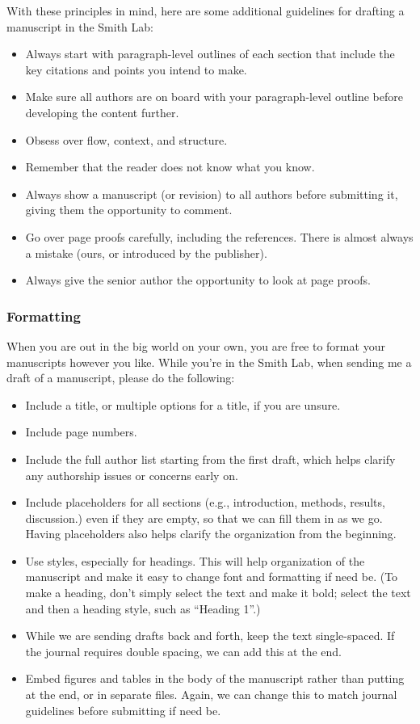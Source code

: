 \documentclass[letterpaper,11pt,oneside]{memoir}
\begin{document}
With these principles in mind, here are some additional guidelines for drafting a manuscript in the Smith Lab:

\begin{itemize}[noitemsep,nolistsep]
\item Always start with paragraph-level outlines of each section that include the key citations and points you intend to make.
\item Make sure all authors are on board with your paragraph-level outline before developing the content further.
\item Obsess over flow, context, and structure.
\item Remember that the reader does not know what you know.
\item Always show a manuscript (or revision) to all authors before submitting it, giving them the opportunity to comment.
\item Go over page proofs carefully, including the references. There is almost always a mistake (ours, or introduced by the publisher).
\item Always give the senior author the opportunity to look at page proofs.
\end{itemize}


\subsubsection{Formatting}

When you are out in the big world on your own, you are free to format your manuscripts however you like. While you're in the Smith Lab, when sending me a draft of a manuscript, please do the following:

\begin{itemize}[noitemsep,nolistsep]
\item Include a title, or multiple options for a title, if you are unsure. 
\item Include page numbers.
\item Include the full author list starting from the first draft, which helps clarify any authorship issues or concerns early on.
\item Include placeholders for all sections (e.g., introduction, methods, results, discussion.) even if they are empty, so that we can fill them in as we go. Having placeholders also helps clarify the organization from the beginning.
\item Use styles, especially for headings. This will help organization of the manuscript and make it easy to change font and formatting if need be. (To make a heading, don't simply select the text and make it bold; select the text and then a heading style, such as ``Heading 1''.)
\item While we are sending drafts back and forth, keep the text single-spaced. If the journal requires double spacing, we can add this at the end.
\item Embed figures and tables in the body of the manuscript rather than putting at the end, or in separate files. Again, we can change this to match journal guidelines before submitting if need be.
\end{itemize}
\end{document}
